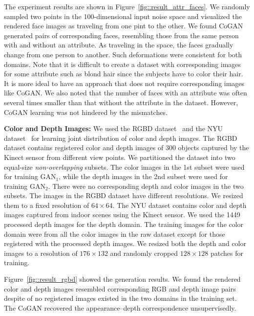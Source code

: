 The experiment results are shown in Figure~\ref{fig::result_attr_faces}. We randomly sampled two points in the 100-dimensional input noise space and visualized the rendered face images as traveling from one pint to the other. We found CoGAN generated pairs of corresponding faces, resembling those from the same person with and without an attribute. As traveling in the space, the faces gradually change from one person to another. Such deformations were consistent for both domains. Note that it is difficult to create a dataset with corresponding images for some attribute such as blond hair since the subjects have to color their hair. It is more ideal to have an approach that does not require corresponding images like CoGAN. We also noted that the number of faces with an attribute was often several times smaller than that without the attribute in the dataset. However, CoGAN learning was not hindered by the mismatches.

{\bf Color and Depth Images:} We used the RGBD dataset~\cite{lai2011large} and the NYU dataset~\cite{silberman2012indoor} for learning joint distribution of color and depth images. The RGBD dataset contains registered color and depth images of 300 objects captured by the Kinect sensor from different view points. We partitioned the dataset into two equal-size {\it non-overlapping} subsets. The color images in the 1st subset were used for training $\text{GAN}_1$, while the depth images in the 2nd subset were used for training $\text{GAN}_2$. There were no corresponding depth and color images in the two subsets. The images in the RGBD dataset have different resolutions. We resized them to a fixed resolution of $64\times64$. The NYU dataset contains color and depth images captured from indoor scenes using the Kinect sensor. We used the 1449 processed depth images for the depth domain. The training images for the color domain were from all the color images in the raw dataset except for those registered with the processed depth images. We resized both the depth and color images to a resolution of $176\times132$ and randomly cropped $128\times128$ patches for training. 

Figure~\ref{fig::result_rgbd} showed the generation results. We found the rendered color and depth images resembled corresponding RGB and depth image pairs despite of no registered images existed in the two domains in the training set. The CoGAN recovered the appearance--depth correspondence unsupervisedly.

